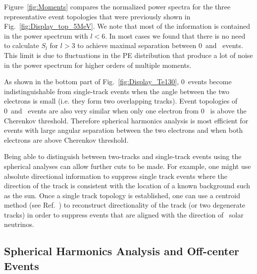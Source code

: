 Figure~\ref{fig:Moments} compares the normalized power spectra for the three representative event topologies that were previously shown in Fig.~\ref{fig:Display_top_5MeV}. We note that most of the information is contained in the power spectrum with $l<$6. In most cases we found that there is no need to calculate $S_l$ for $l>$3 to achieve maximal separation between 0\nbb~and \B~events. This limit is due to fluctuations in the PE distribution that produce a lot of noise in the power spectrum for higher orders of multiple moments.


As shown in the bottom part of Fig.~\ref{fig:Display_Te130}, 0\nbb~events become indistinguishable from single-track events when the angle between the two electrons is small (i.e. they form two overlapping tracks). Event topologies of 0\nbb~and \B~events are also very similar when only one electron from 0\nbb~ is above the Cherenkov threshold. Therefore spherical harmonics analysis is most efficient for events with large angular separation between the two electrons and when both electrons are above Cherenkov threshold. 

Being able to distinguish between two-tracks and single-track events using the spherical analyses can allow further cuts to be made.  For example, one might use absolute directional information to suppress single track events where the direction of the track is consistent with the location of a known background such as the sun. Once a single track topology is established, one can use a centroid method (see Ref.~\cite{Directionality}) to reconstruct directionality of the track (or two degenerate tracks) in order to suppress events that are aligned with the direction of \B~solar neutrinos.

\subsection{Spherical Harmonics Analysis and Off-center Events}

